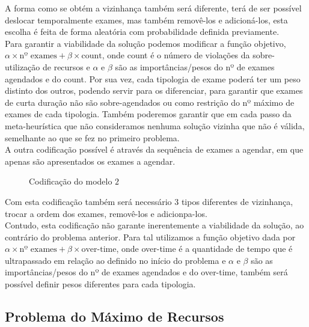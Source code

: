 A forma como se obtém a vizinhança também será diferente, terá de ser possível deslocar temporalmente exames, mas também removê-los e adicioná-los, esta escolha é feita de forma aleatória com probabilidade definida previamente.\\

Para garantir a viabilidade da solução podemos modificar a função objetivo, $\alpha \times \text{nº exames} + \beta \times \text{count}$, onde count é o número de violações da sobre-utilização de recursos e $\alpha$ e $\beta$ são as importâncias/pesos do nº de exames agendados e do count. Por sua vez, cada tipologia de exame poderá ter um peso distinto dos outros, podendo servir para os diferenciar, para garantir que exames de curta duração não são sobre-agendados ou como restrição do nº máximo de exames de cada tipologia. Também poderemos garantir que em cada passo da meta-heurística que não consideramos nenhuma solução vizinha que não é válida, semelhante ao que se fez no primeiro problema.\\

A outra codificação possível é através da sequência de exames a agendar, em que apenas são apresentados os exames a agendar.\\

\begin{figure}[h]
    \centering
    \makebox[\textwidth][c]{%
        \texttt{[image: P2M2]}
    }
    \caption{Codificação do modelo $2$}
    \label{fig:cod_prob2_mod2}
\end{figure}

Com esta codificação também será necessário 3 tipos diferentes de vizinhança, trocar a ordem dos exames, removê-los e adicionpa-los.\\

Contudo, esta codificação não garante inerentemente a viabilidade da solução, ao contrário do problema anterior. Para tal utilizamos a função objetivo dada por $\alpha \times \text{nº exames} + \beta \times \text{over-time}$, onde over-time é a quantidade de tempo que é ultrapassado em relação ao definido no início do problema e $\alpha$ e $\beta$ são as importâncias/pesos do nº de exames agendados e do over-time, também será possível definir pesos diferentes para cada tipologia.\\

\subsection{Problema do Máximo de Recursos}

